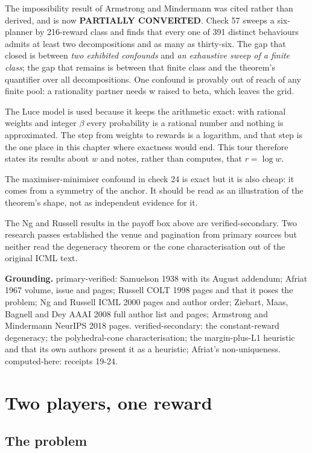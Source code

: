 The impossibility result of Armstrong and Mindermann was cited rather than derived, and is now \textbf{PARTIALLY CONVERTED}. Check 57 sweeps a six-planner by 216-reward class and finds that every one of 391 distinct behaviours admits at least two decompositions and as many as thirty-six. The gap that closed is between \emph{two exhibited confounds} and \emph{an exhaustive sweep of a finite class}; the gap that remains is between that finite class and the theorem's quantifier over all decompositions. One confound is provably out of reach of any finite pool: a rationality partner needs w raised to beta, which leaves the grid.

The Luce model is used because it keeps the arithmetic exact: with rational weights and integer $\beta$ every probability is a rational number and nothing is approximated. The step from weights to rewards is a logarithm, and that step is the one place in this chapter where exactness would end. This tour therefore states its results about $w$ and notes, rather than computes, that $r = \log w$.

The maximiser-minimiser confound in check 24 is exact but it is also cheap: it comes from a symmetry of the anchor. It should be read as an illustration of the theorem's shape, not as independent evidence for it.

The Ng and Russell results in the payoff box above are verified-secondary. Two research passes established the venue and pagination from primary sources but neither read the degeneracy theorem or the cone characterisation out of the original ICML text.

\textbf{Grounding.} primary-verified: Samuelson 1938 with its August addendum; Afriat 1967 volume, issue and pages; Russell COLT 1998 pages and that it poses the problem; Ng and Russell ICML 2000 pages and author order; Ziebart, Maas, Bagnell and Dey AAAI 2008 full author list and pages; Armstrong and Mindermann NeurIPS 2018 pages. verified-secondary: the constant-reward degeneracy; the polyhedral-cone characterisation; the margin-plus-L1 heuristic and that its own authors present it as a heuristic; Afriat's non-uniqueness. computed-here: receipts 19-24.

\chapter{Two players, one reward}

\section*{The problem}

